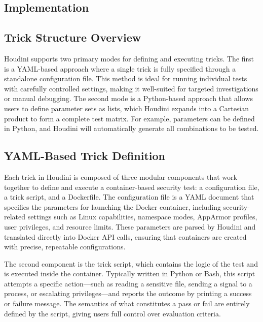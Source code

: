 \documentclass[12pt]{report}
\begin{document}
\begin{doublespace}
\chapter{Implementation}


\section{Trick Structure Overview}

Houdini supports two primary modes for defining and executing tricks. The first is a YAML-based approach where a single trick is fully specified through a standalone configuration file. This method is ideal for running individual tests with carefully controlled settings, making it well-suited for targeted investigations or manual debugging. The second mode is a Python-based approach that allows users to define parameter sets as lists, which Houdini expands into a Cartesian product to form a complete test matrix. For example, parameters can be defined in Python, and Houdini will automatically generate all combinations to be tested.



\section{YAML-Based Trick Definition}

Each trick in Houdini is composed of three modular components that work together to define and execute a container-based security test: a configuration file, a trick script, and a Dockerfile. The configuration file is a YAML document that specifies the parameters for launching the Docker container, including security-related settings such as Linux capabilities, namespace modes, AppArmor profiles, user privileges, and resource limits. These parameters are parsed by Houdini and translated directly into Docker API calls, ensuring that containers are created with precise, repeatable configurations.

The second component is the trick script, which contains the logic of the test and is executed inside the container. Typically written in Python or Bash, this script attempts a specific action—such as reading a sensitive file, sending a signal to a process, or escalating privileges—and reports the outcome by printing a success or failure message. The semantics of what constitutes a pass or fail are entirely defined by the script, giving users full control over evaluation criteria.


\end{doublespace}
\end{document}
